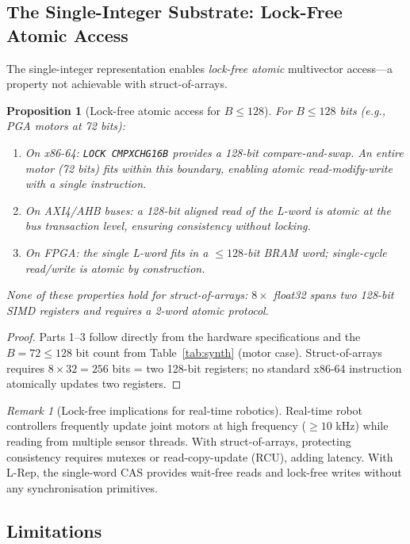 \documentclass[11pt,a4paper]{article}
\theoremstyle{definition}
\theoremstyle{plain}
\newtheorem{proposition}{Proposition}[section]
\theoremstyle{remark}
\newtheorem{remark}{Remark}[section]
\begin{document}
\subsection{The Single-Integer Substrate: Lock-Free Atomic Access}

The single-integer representation enables \emph{lock-free atomic}
multivector access---a property not achievable with struct-of-arrays.

\begin{proposition}[Lock-free atomic access for $B\le128$]
\label{prop:atomic}
For $B\le128$ bits (e.g., PGA motors at 72 bits):
\begin{enumerate}
  \item On x86-64: \texttt{LOCK CMPXCHG16B} provides a 128-bit
        compare-and-swap.
        An entire motor (72 bits) fits within this boundary, enabling
        atomic read-modify-write with a single instruction.
  \item On AXI4/AHB buses: a 128-bit aligned read of the L-word is atomic
        at the bus transaction level, ensuring consistency without locking.
  \item On FPGA: the single L-word fits in a $\le128$-bit BRAM word;
        single-cycle read/write is atomic by construction.
\end{enumerate}
None of these properties hold for struct-of-arrays: $8\times$ float32
spans two 128-bit SIMD registers and requires a 2-word atomic protocol.
\end{proposition}

\begin{proof}
Parts 1--3 follow directly from the hardware specifications and the
$B=72\le128$ bit count from Table~\ref{tab:synth} (motor case).
Struct-of-arrays requires $8\times32=256$ bits = two 128-bit registers;
no standard x86-64 instruction atomically updates two registers.
\end{proof}

\begin{remark}[Lock-free implications for real-time robotics]
Real-time robot controllers frequently update joint motors at high
frequency ($\ge10$ kHz) while reading from multiple sensor threads.
With struct-of-arrays, protecting consistency requires mutexes or
read-copy-update (RCU), adding latency.
With L-Rep, the single-word CAS provides wait-free reads and lock-free
writes without any synchronisation primitives.
\end{remark}

\subsection{Limitations}
\end{document}
